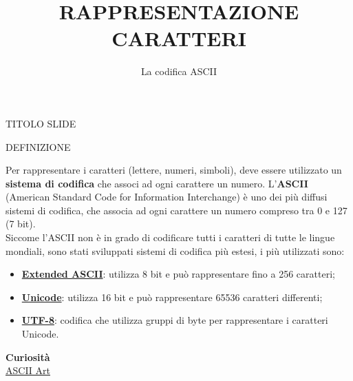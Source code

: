 \documentclass[aspectratio=1610]{beamer}
\title{RAPPRESENTAZIONE CARATTERI}
\subtitle{La codifica ASCII}
\date{}
\institute{\textit{
        Fonti:
        \begin{itemize}
            \item[-] \href{https://catalogo.sanoma.it/si-op-104157-dal-bit-all-intelligenza-artificiale.html}{Dal BIT all'INTELLIGENZA ARTIFICIALE}
        \end{itemize}
    }
}
\begin{document}
\begin{frame}
    \titlepage
\end{frame}

\begin{frame}{TITOLO SLIDE}
    \begin{alertblock}{DEFINIZIONE}
        \begin{minipage}{0.98\linewidth}
            \justifying
            Per rappresentare i caratteri (lettere, numeri, simboli), deve essere utilizzato un 
            \textbf{sistema di codifica} che associ ad ogni carattere un numero. 
            L'\textbf{ASCII} (American Standard Code for Information Interchange) è uno dei più 
            diffusi sistemi di codifica, che associa ad ogni carattere un numero compreso tra 0 e 127 (7 bit).\\
            \pause
            Siccome l'ASCII non è in grado di codificare tutti i caratteri di tutte le lingue mondiali, 
            sono stati sviluppati sistemi di codifica più estesi, i più utilizzati sono:
            \begin{itemize}
                \pause
                \item \href{https://it.wikipedia.org/wiki/ASCII_esteso}{\textbf{Extended ASCII}}: utilizza 8 bit e può rappresentare fino a 256 caratteri;
                \pause
                \item \href{https://it.wikipedia.org/wiki/Unicode}{\textbf{Unicode}}: utilizza 16 bit e può rappresentare 65536 caratteri differenti;
                \pause
                \item \href{https://it.wikipedia.org/wiki/UTF-8}{\textbf{UTF-8}}: codifica che utilizza gruppi di byte per rappresentare i caratteri Unicode. 
            \end{itemize}
            \bigskip
            \tiny{\textbf{Curiosità}}\\
            \tiny{\href{https://www.asciiart.eu/}{ASCII Art}}
        \end{minipage}
    \end{alertblock}
\end{frame}
\end{document}
